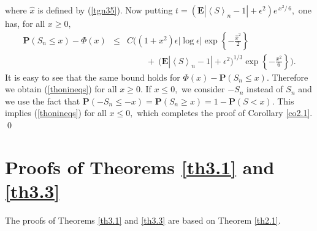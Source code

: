\documentclass{gSTA2e}
\theoremstyle{plain}
\theoremstyle{definition}
\theoremstyle{remark}
\begin{document}
where $\widehat{x}$ is defined by (\ref{tgn35}).
Now putting $t=(\mathbf{E} |\! \left\langle S\right\rangle_n -1| + \epsilon^2) e^{\, x^2\!/\,6},$ one has, for all $x\geq 0, $
\begin{eqnarray*}
\mathbf{P}(S_n  \leq x )-  \Phi\left( x\right)   & \leq &
C  \bigg( \! \left(  1+ x^2 \right)\epsilon|\log \epsilon| \exp\left\{-\frac{\widehat{x}^2}{2}\right\} \\
 && \ \ \ \ \ \  \ \ \ \    + \ \Big(\mathbf{E} |\! \left\langle S\right\rangle_n -1| + \epsilon^2 \Big)^{1/3}  \exp\left\{-\frac{x^2}{6}\right\} \bigg).
\end{eqnarray*}
It is easy to see that the same bound holds for $ \Phi\left( x\right) -  \mathbf{P}(S_n  \leq x ). $
Therefore we obtain (\ref{thonineqs})
for all $x\geq 0.$ If $x\leq 0, $ we consider $-S_n$ instead of $S_n$ and we use the fact that
$ \mathbf{P}(-S_n \leq -x )= \mathbf{P}(S_n \geq x )= 1- \mathbf{P}(S < x )$.
This implies (\ref{thonineqs}) for all $x \leq 0,$ which completes the proof of
Corollary \ref{co2.1}. \hfill\qed





\section{Proofs of Theorems \ref{th3.1} and \ref{th3.3}}\label{sec5}
The proofs of Theorems \ref{th3.1} and \ref{th3.3} are based on Theorem \ref{th2.1}.
\end{document}
